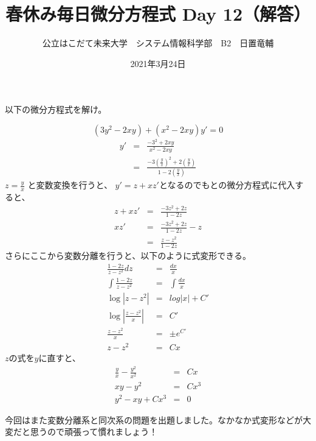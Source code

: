 \documentclass[dvipdfmx,uplatex]{jsarticle}
\title{春休み毎日微分方程式 Day 12（解答）}
\author{公立はこだて未来大学　システム情報科学部　B2　日置竜輔}
\date{2021年3月24日}
\begin{document}
\begin{spacing}{1.6}
\maketitle

以下の微分方程式を解け。
\begin{qparts}
  \qpart
  \begin{equation*}
      (3y^2 - 2xy) + (x^2-2xy)y' = 0
  \end{equation*}
  \begin{eqnarray*}
    y' & = & \frac{-3^2 + 2xy}{x^2 - 2xy} \\
    & = & \frac{-3\left(\frac{y}{x}\right)^2 + 2\left(\frac{y}{x}\right)}{1 - 2\left(\frac{y}{x}\right)}
  \end{eqnarray*}
  $\displaystyle z = \frac{y}{x}$ と変数変換を行うと、 $y' = z + xz'$となるのでもとの微分方程式に代入すると、\\
  \begin{eqnarray*}
    z + xz' & = & \frac{-3z^2 + 2z}{1 - 2z} \\
    xz' & = & \frac{-3z^2 + 2z}{1 - 2z} - z \\
    & = & \frac{z - z^2}{1 - 2z}
  \end{eqnarray*}
  さらにここから変数分離を行うと、以下のように式変形できる。
  \begin{eqnarray*}
    \frac{1 - 2z}{z - z^2}dz & = & \frac{dx}{x} \\
    \int \frac{1 - 2z}{z - z^2} & = & \int \frac{dx}{x} \\
    \log |z - z^2| & = & log|x| + C' \\
    \log \left|\frac{z - z^2}{x}\right| & = & C' \\
    \frac{z - z^2}{x} & = & \pm e^{C'} \\
    z - z^2 & = & Cx
  \end{eqnarray*}
  $z$の式を$y$に直すと、
  \begin{eqnarray*}
    \frac{y}{x} - \frac{y^2}{x^2} & = & Cx \\
    xy - y^2 & = & Cx^3 \\
    y^2 - xy + Cx^3 & = & 0
  \end{eqnarray*}
  \end{qparts}
\end{spacing}
\begin{shadebox}
  今回はまた変数分離系と同次系の問題を出題しました。なかなか式変形などが大変だと思うので頑張って慣れましょう！
\end{shadebox}
\end{document}
